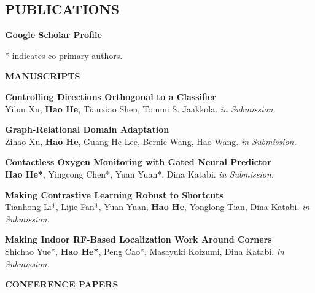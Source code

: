 \documentclass[margin]{res}
\newcommand{\Bullet}[1]{{\raisebox{0.25ex}{\tiny$\bullet$\ }}{#1}\\}
\begin{document}
\begin{resume}

\section{PUBLICATIONS}
\href{https://scholar.google.com/citations?user=v1sUoqwAAAAJ&hl=en&oi=ao}{\textbf{Google Scholar Profile}}

\small{* indicates co-primary authors.}

\textbf{MANUSCRIPTS}

\textbf{Controlling Directions Orthogonal to a Classifier}\\
Yilun Xu, \textbf{Hao He}, Tianxiao Shen, Tommi S. Jaakkola. \emph{in Submission.}

\textbf{Graph-Relational Domain Adaptation}\\
Zihao Xu, \textbf{Hao He}, Guang-He Lee, Bernie Wang, Hao Wang. \emph{in Submission.}

\textbf{Contactless Oxygen Monitoring with Gated Neural Predictor}\\
\textbf{Hao He*}, Yingcong Chen*, Yuan Yuan*, Dina Katabi. \emph{in Submission.}

\small{\textbf{Making Contrastive Learning Robust to Shortcuts}}\\
Tianhong Li*, Lijie Fan*, Yuan Yuan, \textbf{Hao He}, Yonglong Tian, Dina Katabi. \emph{in Submission.}

\textbf{Making Indoor RF-Based Localization Work Around Corners}\\
Shichao Yue*, \textbf{Hao He*}, Peng Cao*, Masayuki Koizumi, Dina Katabi. \emph{in Submission.}

\textbf{CONFERENCE PAPERS}


\end{resume}
\end{document}
